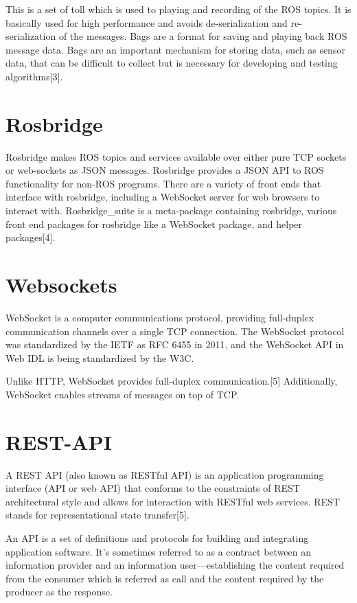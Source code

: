 This is a set of toll which is used to playing and recording of the ROS topics. It is basically used for high performance and avoids de-serialization and re-serialization of the messages. Bags are a format for saving and playing back ROS message data. Bags are an important mechanism for storing data, such as sensor data, that can be difficult to collect but is necessary for developing and testing algorithms[3]. 

\section{Rosbridge}


Rosbridge makes ROS topics and services available over either pure TCP sockets or web-sockets as JSON messages. Rosbridge provides a JSON API to ROS functionality for non-ROS programs. There are a variety of front ends that interface with rosbridge, including a WebSocket server for web browsers to interact with. Rosbridge\_suite is a meta-package containing rosbridge, various front end packages for rosbridge like a WebSocket package, and helper packages[4].

\section{Websockets}

WebSocket is a computer communications protocol, providing full-duplex communication channels over a single TCP connection. The WebSocket protocol was standardized by the IETF as RFC 6455 in 2011, and the WebSocket API in Web IDL is being standardized by the W3C.


Unlike HTTP, WebSocket provides full-duplex communication.[5] Additionally, WebSocket enables streams of messages on top of TCP.


\section{REST-API}

A REST API (also known as RESTful API) is an application programming interface (API or web API) that conforms to the constraints of REST architectural style and allows for interaction with RESTful web services. REST stands for representational state transfer[5].

An API is a set of definitions and protocols for building and integrating application software. It’s sometimes referred to as a contract between an information provider and an information user—establishing the content required from the consumer which is referred as call and the content required by the producer as the response.
\pagebreak

